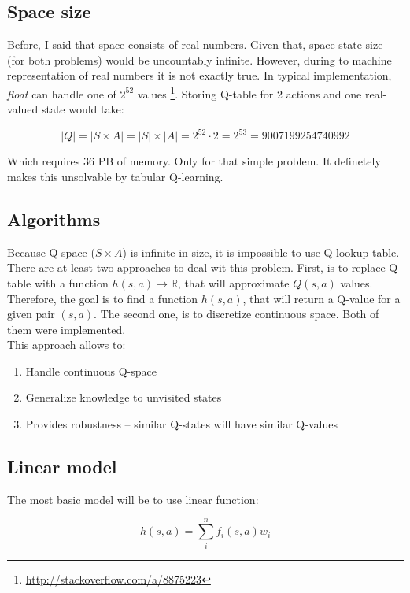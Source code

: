 \documentclass[12pt]{article}
\begin{document}
\subsection{Space size}

Before, I said that space consists of real numbers. Given that, space state size (for both problems) would be uncountably infinite. However, during to machine representation of real numbers it is not exactly true. In typical implementation, \emph{float} can handle one of $2^{52}$ values \footnote{\url{http://stackoverflow.com/a/8875223}}. Storing Q-table for 2 actions and one real-valued state would take:



\begin{equation}
|Q| = |S \times A| = |S| \times |A| = 2^{52} \cdot 2 = 2^{53} = 9007199254740992
\end{equation}

Which requires 36 PB of memory. Only for that simple problem. It definetely makes this unsolvable by tabular Q-learning.

\subsection{Algorithms}

Because Q-space ($S \times A$) is infinite in size, it is impossible to use Q lookup table. There are at least two approaches to deal wit this problem. First, is to replace Q table with a function $h(s,a) \rightarrow \mathbb{R}$, that will approximate $Q(s, a)$ values. Therefore, the goal is to find a function $h(s, a)$, that will return a Q-value for a given pair $(s,a)$. The second one, is to discretize continuous space. Both of them were implemented.
\\[12pt]
This approach allows to:
\begin{enumerate}
\item Handle continuous Q-space
\item Generalize knowledge to unvisited states
\item Provides robustness – similar Q-states will have similar Q-values
\end{enumerate}

\subsection{Linear model}
The most basic model will be to use linear function:

\begin{equation}
h(s, a) = \sum_i^n f_i(s, a)w_i
\end{equation}
\end{document}
